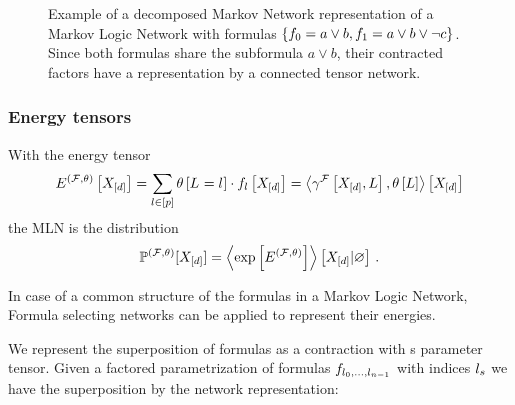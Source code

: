 \begin{figure}[h]
\begin{center}
	
\end{center}
\caption{Example of a decomposed Markov Network representation of a Markov Logic Network with formulas $\{f_{0} = a\lor b, f_{1} = a \lor b \lor \lnot c\}$.
	Since both formulas share the subformula $a\lor b$, their contracted factors have a representation by a connected tensor network.}
\label{fig:mlnDecRep}
\end{figure}




\subsubsection{Energy tensors}

With the energy tensor
\begin{align}
	E^{(\mathcal{F},\theta)}\left[X_{[d]}\right]
	= \sum_{l\in[p]} \theta\left[L_{}=l_{}\right] \cdot f_{l}\left[X_{[d]}\right] 
	= \left\langle \gamma^{\mathcal{F}}\left[X_{[d]},L\right],\theta\left[L\right]\right\rangle \left[ X_{[d]} \right] 
\end{align}
the MLN is the distribution
\begin{align}
	\mathbb{P}^{(\mathcal{F},\theta)}[X_{[d]}] = \left\langle \mathrm{exp}\left[E^{(\mathcal{F},\theta)}\right]\right\rangle \left[ X_{[d]} | \varnothing \right] \, . 
\end{align}

In case of a common structure of the formulas in a Markov Logic Network, Formula selecting networks can be applied to represent their energies.

We represent the superposition of formulas as a contraction with s parameter tensor.
Given a factored parametrization of formulas $f_{l_{0},\ldots,l_{n-1}}$ with indices $l_{s}$ we have the superposition by the network representation:
\begin{center}
	
\end{center}


